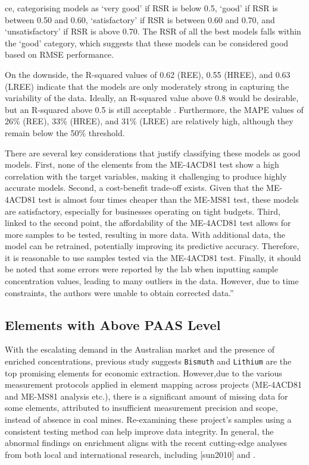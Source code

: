 \documentclass[11pt,a4paper,]{article}
\begin{document}
ce, categorising models as `very good' if RSR is below 0.5, `good' if RSR is between 0.50 and 0.60, `satisfactory' if RSR is between 0.60 and 0.70, and `unsatisfactory' if RSR is above 0.70. The RSR of all the best models falls within the `good' category, which suggests that these models can be considered good based on RMSE performance.

On the downside, the R-squared values of 0.62 (REE), 0.55 (HREE), and 0.63 (LREE) indicate that the models are only moderately strong in capturing the variability of the data. Ideally, an R-squared value above 0.8 would be desirable, but an R-squared above 0.5 is still acceptable \autocite{Moriasi2007}. Furthermore, the MAPE values of 26\% (REE), 33\% (HREE), and 31\% (LREE) are relatively high, although they remain below the 50\% threshold.

There are several key considerations that justify classifying these models as good models. First, none of the elements from the ME-4ACD81 test show a high correlation with the target variables, making it challenging to produce highly accurate models. Second, a cost-benefit trade-off exists. Given that the ME-4ACD81 test is almost four times cheaper than the ME-MS81 test, these models are satisfactory, especially for businesses operating on tight budgets. Third, linked to the second point, the affordability of the ME-4ACD81 test allows for more samples to be tested, resulting in more data. With additional data, the model can be retrained, potentially improving its predictive accuracy. Therefore, it is reasonable to use samples tested via the ME-4ACD81 test. Finally, it should be noted that some errors were reported by the lab when inputting sample concentration values, leading to many outliers in the data. However, due to time constraints, the authors were unable to obtain corrected data.''

\subsection{Elements with Above PAAS Level}\label{elements-with-above-paas-level-2}

With the escalating demand in the Australian market and the presence of enriched concentrations, previous study suggests \texttt{Bismuth} and \texttt{Lithium} are the top promising elements for economic extraction. However,due to the various measurement protocols applied in element mapping across projects (ME-4ACD81 and ME-MS81 analysis etc.), there is a significant amount of missing data for some elements, attributed to insufficient measurement precision and scope, instead of absence in coal mines. Re-examining these project's samples using a consistent testing method can help improve data integrity. In general, the abnormal findings on enrichment aligns with the recent cutting-edge analyses from both local and international research, including {[}sun2010{]} and \autocite{Hodgkinson2020}.
\end{document}
